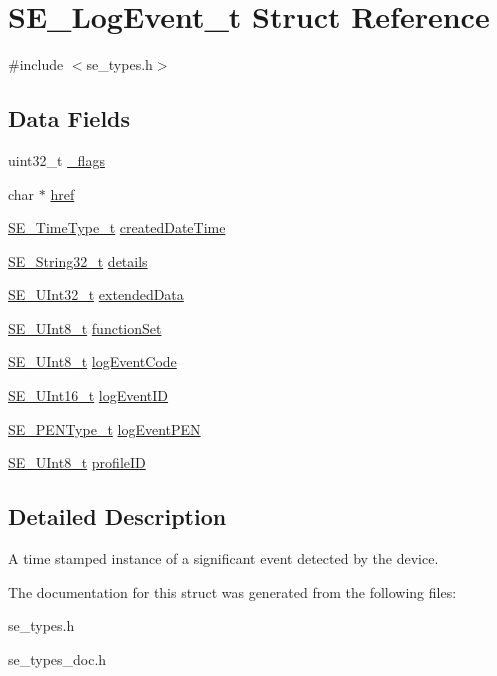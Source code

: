 \hypertarget{structSE__LogEvent__t}{}\section{S\+E\+\_\+\+Log\+Event\+\_\+t Struct Reference}
\label{structSE__LogEvent__t}


{\ttfamily \#include $<$se\+\_\+types.\+h$>$}

\subsection*{Data Fields}
\begin{DoxyCompactItemize}
\item 
uint32\+\_\+t \hyperlink{group__LogEvent_ga7097aa812a92768f9a6444ad1f44e7ab}{\+\_\+flags}
\item 
char $\ast$ \hyperlink{group__LogEvent_ga7a77c2d8bf99665d52ad8a077c62892b}{href}
\item 
\hyperlink{group__TimeType_ga6fba87a5b57829b4ff3f0e7638156682}{S\+E\+\_\+\+Time\+Type\+\_\+t} \hyperlink{group__LogEvent_gacaa033ae90debff32b1e3d913b02b1e0}{created\+Date\+Time}
\item 
\hyperlink{group__String32_gac9f59b06b168b4d2e0d45ed41699af42}{S\+E\+\_\+\+String32\+\_\+t} \hyperlink{group__LogEvent_gab8efc7faed19706fb29eae8aaae704e3}{details}
\item 
\hyperlink{group__UInt32_ga70bd4ecda3c0c85d20779d685a270cdb}{S\+E\+\_\+\+U\+Int32\+\_\+t} \hyperlink{group__LogEvent_ga335ea28cf8492d2ae95aaa2af959d78b}{extended\+Data}
\item 
\hyperlink{group__UInt8_gaf7c365a1acfe204e3a67c16ed44572f5}{S\+E\+\_\+\+U\+Int8\+\_\+t} \hyperlink{group__LogEvent_gae3dd072a18ca3eab7d466064a072a2ed}{function\+Set}
\item 
\hyperlink{group__UInt8_gaf7c365a1acfe204e3a67c16ed44572f5}{S\+E\+\_\+\+U\+Int8\+\_\+t} \hyperlink{group__LogEvent_ga94b54840b21fa653aa8a15407470e017}{log\+Event\+Code}
\item 
\hyperlink{group__UInt16_gac68d541f189538bfd30cfaa712d20d29}{S\+E\+\_\+\+U\+Int16\+\_\+t} \hyperlink{group__LogEvent_ga88d7a251a6ed7939d961c7bc7e9071f4}{log\+Event\+ID}
\item 
\hyperlink{group__PENType_ga75343bbeec563c431fef2977b4dfa4e9}{S\+E\+\_\+\+P\+E\+N\+Type\+\_\+t} \hyperlink{group__LogEvent_ga3b9a19af528c15c42d19845194d6d859}{log\+Event\+P\+EN}
\item 
\hyperlink{group__UInt8_gaf7c365a1acfe204e3a67c16ed44572f5}{S\+E\+\_\+\+U\+Int8\+\_\+t} \hyperlink{group__LogEvent_ga2e3fe4dcccd980fb39556aca65124b51}{profile\+ID}
\end{DoxyCompactItemize}


\subsection{Detailed Description}
A time stamped instance of a significant event detected by the device. 

The documentation for this struct was generated from the following files\+:\begin{DoxyCompactItemize}
\item 
se\+\_\+types.\+h\item 
se\+\_\+types\+\_\+doc.\+h\end{DoxyCompactItemize}
